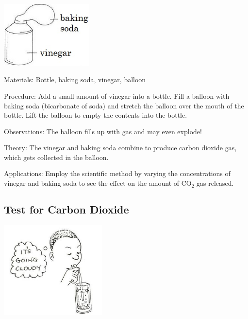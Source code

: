 \begin{multicols}{2}
\begin{center}
\includegraphics[width=0.35\textwidth]{./img/vso/co2-balloon.jpg}
\end{center}

\begin{description*}
\item[Materials:]{Bottle, baking soda, vinegar, balloon}
\item[Procedure:]{Add a small amount of vinegar into a bottle. Fill a balloon with baking soda (bicarbonate of soda) and stretch the balloon over the mouth of the bottle. Lift the balloon to empty the contents into the bottle.}
\item[Observations:]{The balloon fills up with gas and may even explode!}
\item[Theory:]{The vinegar and baking soda combine to produce carbon dioxide gas, which gets collected in the balloon.}
\item[Applications:]{Employ the scientific method by varying the concentrations of vinegar and baking soda to see the effect on the amount of CO$_2$ gas released.}
\end{description*}

\subsection{Test for Carbon Dioxide} 

\begin{center}
\includegraphics[width=0.4\textwidth]{./img/source/limewater-cloudy.jpg}
\end{center}


\end{multicols}
